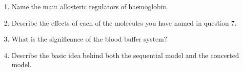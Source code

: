\begin{enumerate}

\item Name the main allosteric regulators of haemoglobin.


\item Describe the effects of each of the molecules you have named in question 7.


\item What is the significance of the blood buffer system?


\item Describe the basic idea behind both the sequential model and the concerted model.



\end{enumerate}

